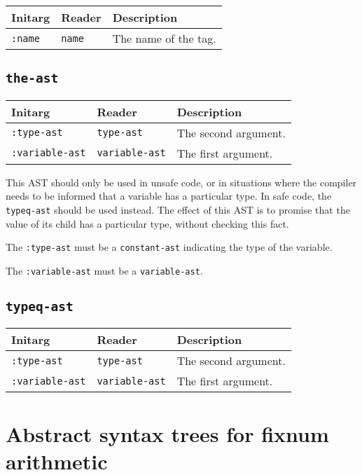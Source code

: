 \begin{tabular}{|l|l|l|}
\hline
Initarg & Reader & Description\\
\hline\hline
\texttt{:name} & \texttt{name} & The name of the tag.\\
\hline
\end{tabular}

\subsection{\texttt{the-ast}}
\label{the-ast}

\begin{tabular}{|l|l|l|}
\hline
Initarg & Reader & Description\\
\hline\hline
\texttt{:type-ast} & \texttt{type-ast} & The second argument.\\
\hline
\texttt{:variable-ast} & \texttt{variable-ast} & The first argument.\\
\hline
\end{tabular}

This AST should only be used in unsafe code, or in situations where
the compiler needs to be informed that a variable has a particular
type.  In safe code, the \texttt{typeq-ast}  should
be used instead.  The effect of this AST is to promise that the value
of its child has a particular type, without checking this fact.

The \texttt{:type-ast} must be a \texttt{constant-ast} indicating the
type of the variable.

The \texttt{:variable-ast} must be a \texttt{variable-ast}.

\subsection{\texttt{typeq-ast}}
\label{typeq-ast}

\begin{tabular}{|l|l|l|}
\hline
Initarg & Reader & Description\\
\hline\hline
\texttt{:type-ast} & \texttt{type-ast} & The second argument.\\
\hline
\texttt{:variable-ast} & \texttt{variable-ast} & The first argument.\\
\hline
\end{tabular}

\section{Abstract syntax trees for fixnum arithmetic}

